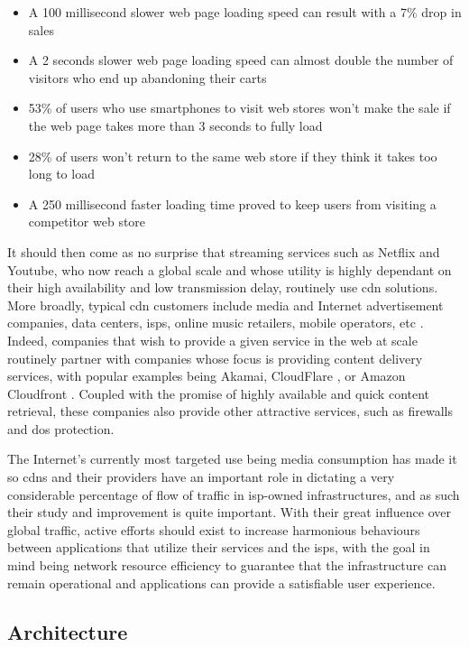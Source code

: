 \begin{itemize}
    \item A 100 millisecond slower web page loading speed can result with a 7\% drop in sales
    \item A 2 seconds slower web page loading speed can almost double the number of visitors who end up abandoning their carts
    \item 53\% of users who use smartphones to visit web stores won't make the sale if the web page takes more than 3 seconds to fully load
    \item 28\% of users won't return to the same web store if they think it takes too long to load
    \item A 250 millisecond faster loading time proved to keep users from visiting a competitor web store
\end{itemize}{}

    It should then come as no surprise that streaming services such as Netflix and Youtube, who now reach a global scale and whose utility is highly dependant on their high availability and low transmission delay, routinely use \gls{cdn} solutions.
    More broadly, typical \gls{cdn} customers include media and Internet advertisement companies, data centers, \glspl{isp}, online music retailers, mobile operators, etc \cite{cdn-survey}.
    Indeed, companies that wish to provide a given service in the web at scale routinely partner with companies whose focus is providing content delivery services, with popular examples being Akamai, CloudFlare \cite{cloudflare}, or Amazon Cloudfront \cite{cloudfront}.
    Coupled with the promise of highly available and quick content retrieval, these companies also provide other attractive services, such as firewalls and \gls{dos} protection.

    The Internet's currently most targeted use being media consumption has made it so \glspl{cdn} and their providers have an important role in dictating a very considerable percentage of flow of traffic in \gls{isp}-owned infrastructures, and as such their study and improvement is quite important.
    With their great influence over global traffic, active efforts should exist to increase harmonious behaviours between applications that utilize their services and the \glspl{isp}, with the goal in mind being network resource efficiency to guarantee that the infrastructure can remain operational and applications can provide a satisfiable user experience.

\subsection{Architecture}

